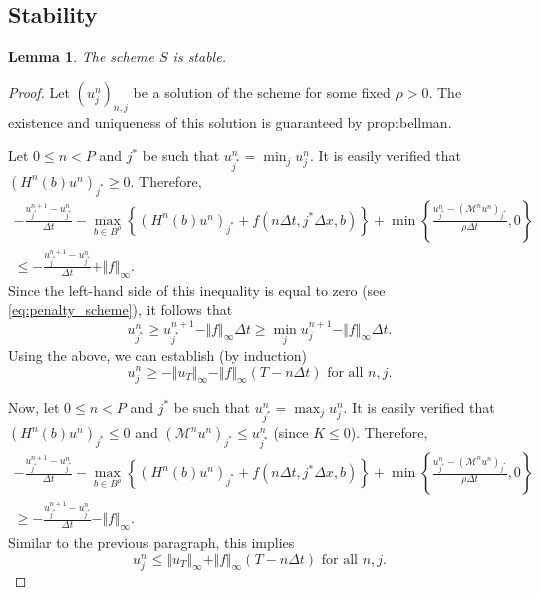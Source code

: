 \documentclass[12pt]{article}
\newcounter{dummy}
\newtheorem{lemma}[dummy]{Lemma}
\begin{document}
\subsection{Stability}
\begin{lemma}
The scheme $S$ is stable.
\end{lemma}
\begin{proof}
Let $(u_{j}^{n})_{n,j}$ be a solution of the scheme for some fixed
$\rho>0$. The existence and uniqueness of this solution is guaranteed
by {\prettyref}{prop:bellman}.

Let $0{\leqslant} n<P$ and $j^{*}$ be such that $u_{j^{*}}^{n}=\min_{j}u_{j}^{n}$.
It is easily verified that $(H^{n}(b)u^{n})_{j^{*}}{\geqslant}0$. Therefore,
\begin{multline*}
-\frac{u_{j^{*}}^{n+1}-u_{j^{*}}^{n}}{\Delta t}-\max_{b\in B^\rho}\left\{ (H^{n}(b)u^{n})_{j^{*}}+f(n\Delta t,j^{*}\Delta x,b)\right\} +\min\left\{ \frac{u_{j^{*}}^{n}-(\mathcal{M}^{n}u^{n})_{j^{*}}}{\rho\Delta t},0\right\} \\
{\leqslant}-\frac{u_{j^{*}}^{n+1}-u_{j^{*}}^{n}}{\Delta t}+\Vert f\Vert_{\infty}.
\end{multline*}
Since the left-hand side of this inequality is equal to zero (see
\eqref{eq:penalty_scheme}), it follows that 
\[
u_{j^{*}}^{n}{\geqslant} u_{j^{*}}^{n+1}-\Vert f\Vert_{\infty}\Delta t{\geqslant}\min_{j}u_{j}^{n+1}-\Vert f\Vert_{\infty}\Delta t.
\]
Using the above, we can establish (by induction)
\[
u_{j}^{n}{\geqslant}-\Vert u_{T}\Vert_{\infty}-\Vert f\Vert_{\infty}\left(T-n\Delta t\right)\text{ for all }n,j.
\]

Now, let $0{\leqslant} n<P$ and $j^{*}$ be such that $u_{j^{*}}^{n}=\max_{j}u_{j}^{n}$.
It is easily verified that $(H^{n}(b)u^{n})_{j^{*}}{\leqslant}0$ and $(\mathcal{M}^{n}u^{n})_{j^{*}}{\leqslant} u_{j^{*}}^{n}$
(since $K{\leqslant}0$). Therefore,
\begin{multline*}
-\frac{u_{j^{*}}^{n+1}-u_{j^{*}}^{n}}{\Delta t}-\max_{b\in B^\rho}\left\{ (H^{n}(b)u^{n})_{j^{*}}+f(n\Delta t,j^{*}\Delta x,b)\right\} +\min\left\{ \frac{u_{j^{*}}^{n}-(\mathcal{M}^{n}u^{n})_{j^{*}}}{\rho\Delta t},0\right\} \\
{\geqslant}-\frac{u_{j^{*}}^{n+1}-u_{j^{*}}^{n}}{\Delta t}-\Vert f\Vert_{\infty}.
\end{multline*}
Similar to the previous paragraph, this implies
\[
u_{j}^{n}{\leqslant}\Vert u_{T}\Vert_{\infty}+\Vert f\Vert_{\infty}\left(T-n\Delta t\right)\text{ for all }n,j.{}
\]
\end{proof}
\end{document}
